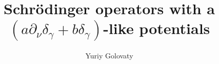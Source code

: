 
\newcommand{\dom}{\mathop{\rm dom}}
\renewcommand{\Im}{\mathop{\rm Im}}
\newcommand{\supp}{\mathop{\rm supp}}
\newcommand{\sgn}{\mathop{\rm sgn}}
\newcommand{\rank}{\mathop{\rm rank}}
\renewcommand{\kappa}{\varkappa}
\newcommand{\rmi}{{\rm i}}
\newcommand{\Real}{\mathbb R}
\newcommand{\Cmpl}{\mathbb C}
\newcommand{\eps}{\varepsilon}
\newcommand{\en}{{\nu,\eps}}
\newcommand{\cI}{\mathcal{I}}
\newcommand{\cF}{\mathcal{F}}
\newcommand{\mv}[1]{\langle #1 \rangle_0}
\newcommand{\fm}[1]{\langle #1 \rangle_1}
\newcommand{\fpr}[1]{{#1}^{(-1)}}
\newcommand{\spr}[1]{{#1}^{(-2)}}
\newcommand{\ra}{\rangle}
\newcommand{\la}{\langle}
\newcommand{\fra}{\mathfrak{a}}

\newcommand{\norm}[1]{\left\Vert#1\right\Vert}
\newcommand{\abs}[1]{\left\vert#1\right\vert}
\newcommand{\set}[1]{\left\{#1\right\}}
\newcommand{\To}{\longrightarrow}
\newcommand{\BX}{\mathbf{B}(X)}
\newcommand{\A}{\mathcal{A}}


\newcommand{\mg}[1]{{\color{magenta}{#1}}}
\newcommand{\rd}[1]{{\color{red}{#1}}}
\renewcommand{\emph}[1]{{\textit{#1}}}
\renewcommand{\phi}{\varphi}
\newcommand\rmd{\mathrm{d}}
\newcommand\rme{\mathrm{e}}
\newcommand\rmR{\mathrm{R}}
\renewcommand{\leq}{\leqslant}
\renewcommand{\geq}{\geqslant}
\newcommand{\myIm}{\mathop{\rm Im}}
\newcommand{\myRe}{\mathop{\rm Re}}
\newcommand{\sign}{\mathop{\rm sign}}
\newcommand{\ess}{\mathop{\rm ess}}
\newcommand{\bl}[1]{{\color{blue}{#1}}}
\newcommand{\oB}[1]{\langle{#1},g\rangle\hskip1pt f+\langle{#1},f\rangle\hskip1pt g}
\newcommand\nep{\textstyle\frac n\eps}
\newcommand\te{\left(\frac t\eps\right)}
\newcommand\se{\left(\frac s\eps\right)}
\newcommand\pfg{p}
\newcommand\hy{\hat{y}_\eps}
\newcommand{\pte}{\partial_t}
\newcommand{\pts}{\partial_s}



\title*{Schr\"{o}dinger operators with a $(a\partial_\nu\delta_\gamma+b\delta_\gamma)$-like potentials}
\author{Yuriy Golovaty}

\maketitle

